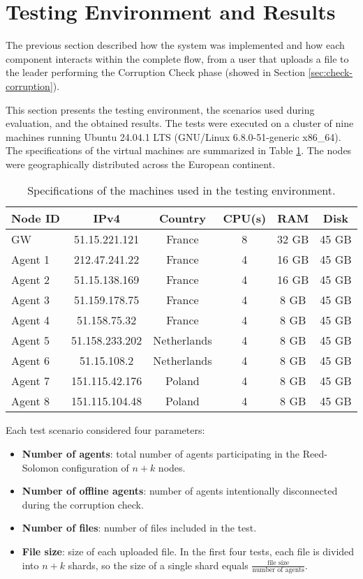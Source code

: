 \section{Testing Environment and Results}

The previous section described how the system was implemented and how each
component interacts within the complete flow, from a user that uploads a file to
the leader performing the Corruption Check phase (showed in Section
\ref{sec:check-corruption}).

This section presents the testing environment, the scenarios used during evaluation, and the obtained results. The tests were executed on a cluster of nine machines running Ubuntu 24.04.1 LTS (GNU/Linux 6.8.0-51-generic x86\_64). The specifications of the virtual machines are summarized in Table \ref{tab:vms-specs}. The nodes were geographically distributed across the European continent.

\begin{table}[h!]
    \centering
    \begin{tabular}{|l|c|c|c|c|c|}
    \hline
        \textbf{Node ID} & \textbf{IPv4} & \textbf{Country} & \textbf{CPU(s)} & \textbf{RAM} & \textbf{Disk} \\
       \hline
        GW & 51.15.221.121 & France & 8 & 32 GB & 45 GB \\
        Agent 1 & 212.47.241.22 & France & 4 & 16 GB & 45 GB \\
        Agent 2 & 51.15.138.169 & France & 4 & 16 GB & 45 GB \\
        Agent 3 & 51.159.178.75 & France & 4 & 8 GB & 45 GB \\
        Agent 4 & 51.158.75.32 & France & 4 & 8 GB & 45 GB \\
        Agent 5 & 51.158.233.202 & Netherlands & 4 & 8 GB & 45 GB \\
        Agent 6 & 51.15.108.2 & Netherlands & 4 & 8 GB & 45 GB \\
        Agent 7 & 151.115.42.176 & Poland & 4 & 8 GB & 45 GB \\
        Agent 8 & 151.115.104.48 & Poland & 4 & 8 GB & 45 GB \\
        \hline
    \end{tabular}
    \caption{Specifications of the machines used in the testing environment.}
    \label{tab:vms-specs}
\end{table}

Each test scenario considered four parameters:
\begin{itemize}
    \item \textbf{Number of agents}: total number of agents participating in the Reed-Solomon configuration of $n + k$ nodes.
    \item \textbf{Number of offline agents}: number of agents intentionally
        disconnected during the corruption check.
    \item \textbf{Number of files}: number of files included in the test.
    \item \textbf{File size}: size of each uploaded file. In the first four tests, each file is divided into $n + k$ shards, so the size of a single shard equals $\frac{\text{file size}}{\text{number of agents}}$.
\end{itemize}

